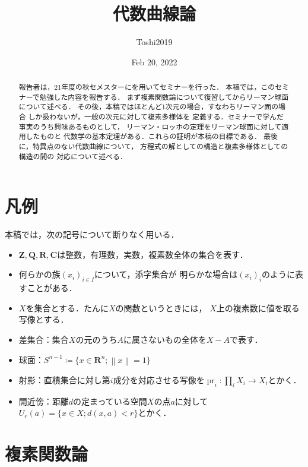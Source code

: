 \documentclass[11pt, a4paper, dvipdfmx, draft]{jsarticle}
\theoremstyle{definition}
\newcommand{\zz}{\mathbf{Z}}
\newcommand{\qq}{\mathbf{Q}}
\newcommand{\rr}{\mathbf{R}}
\newcommand{\cc}{\mathbf{C}}
\newcommand{\pr}{\mathop{\mathrm{pr}}\nolimits} %
\theoremstyle{mystyle}
\begin{document}
\title{代数曲線論}
\author{Toshi2019}

\date{Feb 20, 2022}

\maketitle
\begin{abstract}
    報告者は，21年度の秋セメスターに\cite{ogs}を用いてセミナーを行った．
    本稿では，このセミナーで勉強した内容を報告する．
    まず複素関数論について復習してからリーマン球面について述べる．
    その後，本稿ではほとんど1次元の場合，すなわちリーマン面の場合
    しか扱わないが，一般の次元に対して複素多様体を
    定義する．セミナーで学んだ事実のうち興味あるものとして，
    リーマン・ロッホの定理をリーマン球面に対して適用したものと
    代数学の基本定理がある．これらの証明が本稿の目標である．
    最後に，特異点のない代数曲線について，
    方程式の解としての構造と複素多様体としての構造の間の
    対応について述べる．
\end{abstract}

\section*{凡例}
本稿では，次の記号について断りなく用いる．

\begin{itemize}
    \item $\zz,\qq,\rr,\cc$は整数，有理数，実数，複素数全体の集合を表す．
    \item 何らかの族$(x_i)_{i\in I}$について，添字集合が
    明らかな場合は$(x_i)_{i}$のように表すことがある．
    \item $X$を集合とする．たんに$X$の関数というときには，
    $X$上の複素数に値を取る写像とする．
    \item 差集合：集合$X$の元のうち$A$に属さないもの全体を$X-A$で表す．
    \item 球面：$S^{n-1}\coloneqq \{x\in \rr^{n}; \left\|x\right\|=1\}$
    \item 射影：直積集合に対し第$i$成分を対応させる写像を$\pr_i\colon\prod_{i} X_i\to X_i$とかく．
    \item 開近傍：距離$d$の定まっている空間$X$の点$a$に対して$U_r(a)=\{x\in X; d(x,a)<r\}$とかく．
\end{itemize}
\section{複素関数論}
\end{document}
